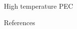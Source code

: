 \documentclass[10pt,compress]{beamer}
\begin{document}
\begin{frame}[allowframebreaks=1.0]{High temperature PEC}
\begin{figure}[h]
            \label{fig_skocic_phd}
        \end{figure}
    \end{frame}




\begin{frame}[allowframebreaks=0.9]{References}
\AtNextBibliography{\tiny}
\nocite{*}
\printbibliography
\end{frame}
\end{document}
